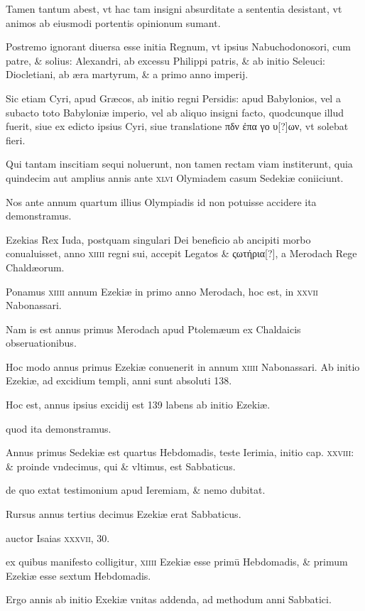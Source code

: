 \begin{parnumbers}
Tamen tantum abest, vt hac tam insigni absurditate a sententia desistant, vt animos ab eiusmodi portentis opinionum sumant.

Postremo ignorant diuersa esse initia Regnum, vt ipsius Nabuchodonosori, cum patre, \& solius: Alexandri, ab excessu Philippi patris, \& ab initio Seleuci: Diocletiani, ab æra martyrum, \& a primo anno imperij.

Sic etiam Cyri, apud Græcos, ab initio regni Persidis: apud Babylonios, vel a subacto toto Babyloniæ imperio, vel ab aliquo insigni facto, quodcunque illud fuerit, siue ex edicto ipsius Cyri, siue translatione \textgreek{πδν ἐπα γο υ[?]ων}, vt solebat fieri.

Qui tantam inscitiam sequi noluerunt, non tamen rectam viam institerunt, quia quindecim aut amplius annis ante \textsc{xlvi} Olymiadem casum Sedekiæ coniiciunt.

Nos ante annum quartum illius Olympiadis id non potuisse accidere ita demonstramus. 

Ezekias Rex Iuda, postquam singulari Dei beneficio ab ancipiti morbo conualuisset, anno \textsc{xiiii} regni sui, accepit Legatos \& \textgreek{ςωτήρια[?]}, a Merodach Rege Chaldæorum.

Ponamus \textsc{xiiii} annum Ezekiæ in primo anno Merodach, hoc est, in \textsc{xxvii} Nabonassari.

Nam is est annus primus Merodach apud Ptolemæum ex Chaldaicis obseruationibus. 

Hoc modo annus primus Ezekiæ conuenerit in annum \textsc{xiiii} Nabonassari. Ab initio Ezekiæ, ad excidium templi, anni sunt absoluti 138.

Hoc est, annus ipsius excidij est 139 labens ab initio Ezekiæ.

quod ita demonstramus. 

Annus primus Sedekiæ est quartus Hebdomadis, teste Ierimia, initio cap. \textsc{xxviii}: \& proinde vndecimus, qui \& vltimus, est Sabbaticus. 

de quo extat testimonium apud Ieremiam, \& nemo dubitat.

Rursus annus tertius decimus Ezekiæ erat Sabbaticus. 

auctor Isaias \textsc{xxxvii}, 30.

ex quibus manifesto colligitur, \textsc{xiiii} Ezekiæ esse primū Hebdomadis, \& primum Ezekiæ esse sextum Hebdomadis. 

Ergo annis ab initio Exekiæ vnitas addenda, ad methodum anni Sabbatici.


\end{parnumbers}
